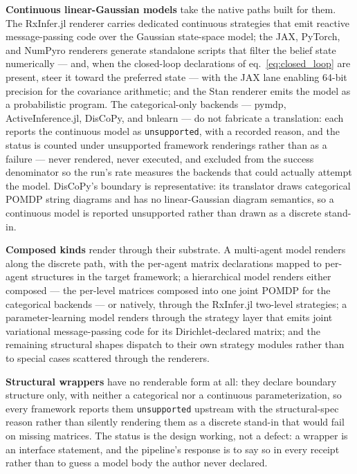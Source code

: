 \documentclass[
  english,
  9pt,
]{extarticle}
\begin{document}
\textbf{Continuous linear-Gaussian models} take the native paths built
for them. The RxInfer.jl renderer carries dedicated continuous
strategies that emit reactive message-passing code over the Gaussian
state-space model; the JAX, PyTorch, and NumPyro renderers generate
standalone scripts that filter the belief state numerically --- and,
when the closed-loop declarations of eq.~\ref{eq:closed_loop} are
present, steer it toward the preferred state --- with the JAX lane
enabling 64-bit precision for the covariance arithmetic; and the Stan
renderer emits the model as a probabilistic program. The
categorical-only backends --- pymdp, ActiveInference.jl, DisCoPy, and
bnlearn --- do not fabricate a translation: each reports the continuous
model as \texttt{unsupported}, with a recorded reason, and the status is
counted under unsupported framework renderings rather than as a failure
--- never rendered, never executed, and excluded from the success
denominator so the run's rate measures the backends that could actually
attempt the model. DisCoPy's boundary is representative: its translator
draws categorical POMDP string diagrams and has no linear-Gaussian
diagram semantics, so a continuous model is reported unsupported rather
than drawn as a discrete stand-in.

\textbf{Composed kinds} render through their substrate. A multi-agent
model renders along the discrete path, with the per-agent matrix
declarations mapped to per-agent structures in the target framework; a
hierarchical model renders either composed --- the per-level matrices
composed into one joint POMDP for the categorical backends --- or
natively, through the RxInfer.jl two-level strategies; a
parameter-learning model renders through the strategy layer that emits
joint variational message-passing code for its Dirichlet-declared
matrix; and the remaining structural shapes dispatch to their own
strategy modules rather than to special cases scattered through the
renderers.

\textbf{Structural wrappers} have no renderable form at all: they
declare boundary structure only, with neither a categorical nor a
continuous parameterization, so every framework reports them
\texttt{unsupported} upstream with the structural-spec reason rather
than silently rendering them as a discrete stand-in that would fail on
missing matrices. The status is the design working, not a defect: a
wrapper is an interface statement, and the pipeline's response is to say
so in every receipt rather than to guess a model body the author never
declared.
\end{document}
